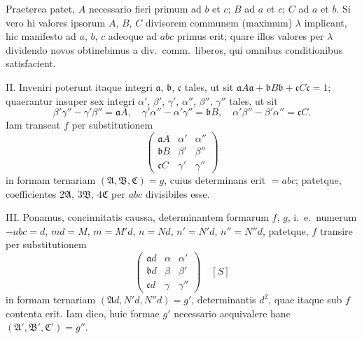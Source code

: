 \documentclass[12pt,a4paper]{article}
\theoremstyle{plain}
\theoremstyle{definition}
\theoremstyle{remark}
\begin{document}
Praeterea patet, $A$ necessario fieri primum ad $b$ et $c$; $B$ ad $a$ et $c$; $C$ ad $a$ et $b$. Si vero hi valores ipsorum $A$, $B$, $C$ divisorem communem (maximum) $\lambda$ implicant, hic manifesto ad $a$, $b$, $c$ adeoque ad $abc$ primus erit; quare illos valores per $\lambda$ dividendo novos obtinebimus a div.~comm.~liberos, qui omnibus conditionibus satisfacient.

\textsc{II.} Inveniri poterunt itaque integri $\mathfrak{a}$, $\mathfrak{b}$, $\mathfrak{c}$ tales, ut sit $\mathfrak{a}A\mathfrak{a} + \mathfrak{b}B\mathfrak{b} + \mathfrak{c}C\mathfrak{c} = 1$; quaerantur insuper sex integri $\alpha'$, $\beta'$, $\gamma'$, $\alpha''$, $\beta''$, $\gamma''$ tales, ut sit
\[
\beta'\gamma'' - \gamma'\beta'' = \mathfrak{a}A,\quad \gamma'\alpha'' - \alpha'\gamma'' = \mathfrak{b}B,\quad \alpha'\beta'' - \beta'\alpha'' = \mathfrak{c}C.
\]
Iam transeat $f$ per substitutionem
\[
\begin{pmatrix}
\mathfrak{a}A & \alpha' & \alpha'' \\
\mathfrak{b}B & \beta' & \beta'' \\
\mathfrak{c}C & \gamma' & \gamma''
\end{pmatrix}
\]
in formam ternariam $(\mathfrak{A}, \mathfrak{B}, \mathfrak{C}) = g$, cuius determinans erit $= abc$; patetque, coefficientes $2\mathfrak{A}$, $3\mathfrak{B}$, $4\mathfrak{C}$ per $abc$ divisibiles esse.

\textsc{III.} Ponamus, concinnitatis caussa, determinantem formarum $f$, $g$, i.~e.~numerum $-abc = d$, $md = M$, $m = M'd$, $n = Nd$, $n' = N'd$, $n'' = N''d$, patetque, $f$ transire per substitutionem
\[
\begin{pmatrix}
\mathfrak{a}d & \alpha & \alpha' \\
\mathfrak{b}d & \beta & \beta' \\
\mathfrak{c}d & \gamma & \gamma''
\end{pmatrix}
\quad [S]
\]
in formam ternariam $(\mathfrak{A}d, N'd, N''d) = g'$, determinantis $d^2$, quae itaque sub $f$ contenta erit. Iam dico, huic formae $g'$ necessario aequivalere hanc $(\mathfrak{A}', \mathfrak{B}', \mathfrak{C}') = g''$.
\end{document}
